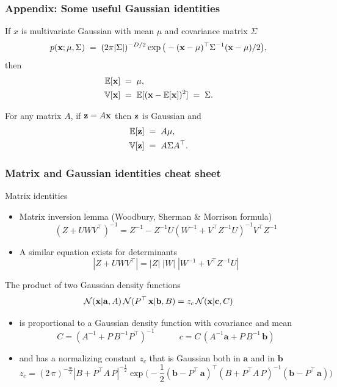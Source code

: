 \begin{frame}

\frametitle{Appendix: Some useful Gaussian identities}
If $x$ is multivariate Gaussian with mean $\mu$ and
covariance matrix $\Sigma$
\[
p({\bf x}; \mu, \Sigma)\;=\;(2\pi|\Sigma|)^{-D/2}\exp\big(-({\bf
    x}-\mu)^\top\Sigma^{-1}({\bf x}-\mu)/2\big),
\]
then
\[
\begin{split}
\mathbb{E}[{\bf x}]\;&=\;\mu,\\
\mathbb{V}[{\bf x}]\;&=\;\mathbb{E}[({\bf x}-\mathbb{E}[{\bf x}])^2]\;=\;\Sigma.
\end{split}
\]

For any matrix $A$, if ${\bf z} = A{\bf x}$ then ${\bf z}$ is Gaussian and
\[
\begin{split}
\mathbb{E}[{\bf z}] \;&=\; A\mu,\\
\mathbb{V}[{\bf z}] \;&=\;A\Sigma A^\top.
\end{split}
\]
\end{frame}

\begin{frame}
\frametitle{Matrix and Gaussian identities cheat sheet}

Matrix identities
\begin{itemize}
\item Matrix inversion lemma (Woodbury, Sherman \& Morrison formula)
%
\[
(Z+UWV^\top)^{-1}=Z^{-1}-Z^{-1}U(W^{-1}+V^\top Z^{-1}U)^{-1}V^\top Z^{-1}
\]
%
\item A similar equation exists for determinants
\[
|Z+UWV^\top|=|Z|\;|W|\;|W^{-1}+V^\top Z^{-1}U|
\]
\end{itemize}

The product of two Gaussian density functions
%
\[
\mathcal{N}(\mathbf x|{\mathbf a},A)\,\mathcal{N}(P^\top\,\mathbf x|{\mathbf b},B) = z_c\,
\mathcal{N}(\mathbf x|{\mathbf c},C)
\]
%
\vspace{-5mm}
\begin{itemize}
\item is proportional to a Gaussian density function with covariance and mean
%
\[
C = \left(A^{-1}+P\,B^{-1}P^\top\right)^{-1}\enspace \hspace{1cm} c =
C\,\left(A^{-1}{\mathbf a}+P\,B^{-1}\,{\mathbf b}\right)
\]
%
\item and has a normalizing constant $z_c$ that is Gaussian both in ${\mathbf
a}$ and in ${\mathbf b}$ 
%
\[
z_c = (2\,\pi)^{-\frac{m}{2}}|B+P^\top A\,P|^{-\frac{1}{2}}
\exp\big(-\frac{1}{2}({\mathbf b}-P^\top\,{\mathbf a})^\top
\left(B+P^\top A\,P\right)^{-1}({\mathbf b}-P^\top\,{\mathbf a})
\big)
\]
%
\end{itemize}
\end{frame}



